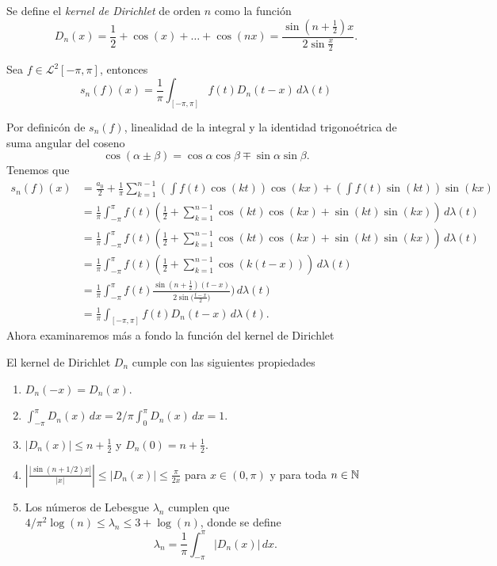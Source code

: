 \documentclass[main.tex]{subfiles}
\begin{document}
  \begin{def.}
    Se define el \emph{kernel de Dirichlet} de orden \(n\) como la funci\'on
    \[
      D_{n}(x)=\frac{1}{2}+\cos(x)+\dots+\cos(nx)=\frac{\sin(n+\frac{1}{2})x}{2\sin\frac{x}{2}}.
    \]
  \end{def.}
  \begin{prop}
    Sea \(f\in\mathcal{L}^{2}[-\pi,\pi]\), entonces
    \[
      s_{n}(f)(x)=\frac{1}{\pi}\int_{[-\pi,\pi]}f(t)D_{n}(t-x)\,d\lambda(t)
    \]
  \end{prop}
  \dem Por definic\'on de \(s_{n}(f)\), linealidad de la integral y la identidad trigono\'etrica de suma angular del coseno
  \[
    \cos(\alpha\pm\beta)=\cos\alpha\cos\beta\mp\sin\alpha\sin\beta.
  \]
  Tenemos que
  \begin{align*}  s_{n}(f)(x)&=\frac{a_{0}}{2}+\frac{1}{\pi}\sum_{k=1}^{n-1}\left(\int f(t)\cos(kt)\right)\cos(kx)+\left(\int f(t)\sin(kt)\right)\sin(kx)\\
    &=\frac{1}{\pi}\int_{-\pi}^{\pi}f(t)\left(\frac{1}{2}+\sum_{k=1}^{n-1}\cos(kt)\cos(kx)+\sin(kt)\sin(kx)\right)\,d\lambda(t)\\
    &=\frac{1}{\pi}\int_{-\pi}^{\pi}f(t)\left(\frac{1}{2}+\sum_{k=1}^{n-1}\cos(kt)\cos(kx)+\sin(kt)\sin(kx)\right)\,d\lambda(t)\\
    &=\frac{1}{\pi}\int_{-\pi}^{\pi}f(t)\left(\frac{1}{2}+\sum_{k=1}^{n-1}\cos(k(t-x))\right)\,d\lambda(t)\\
    &=\frac{1}{\pi}\int_{-\pi}^{\pi}f(t)\frac{\sin(n+\frac{1}{2})(t-x)}{2\sin\big(\frac{t-x}{2}\big)})\,d\lambda(t)\\
    &=\frac{1}{\pi}\int_{[-\pi,\pi]}f(t)D_{n}(t-x)\,d\lambda(t).
  \end{align*}
  Ahora examinaremos m\'as a fondo la funci\'on del kernel de Dirichlet
  \begin{lema}
    El kernel de Dirichlet \(D_{n}\) cumple con las siguientes propiedades
    \begin{enumerate}
      \item \(D_{n}(-x)=D_{n}(x)\).
      \item \(\int_{-\pi}^{\pi}D_{n}(x)\,dx=2/\pi\int_{0}^{\pi}D_{n}(x)\,dx=1\).
      \item \(|D_{n}(x)|\leq n+\frac{1}{2}\) y \(D_{n}(0)=n+\frac{1}{2}\).
      \item \(|\frac{|\sin(n+1/2)x|}{|x|}|\leq |D_{n}(x)|\leq\frac{\pi}{2x}\) para \(x\in(0,\pi)\) y para toda \(n\in \mathbb N \)
      \item Los n\'umeros de Lebesgue \(\lambda_{n}\) cumplen que \(4/\pi^{2}\log(n)\leq\lambda_{n}\leq 3+\log(n)\), donde se define
            \[
            \lambda_{n}=\frac{1}{\pi}\int_{-\pi}^{\pi}|D_{n}(x)|\,dx.
            \]
      \end{enumerate}
    \end{lema}
\end{document}

